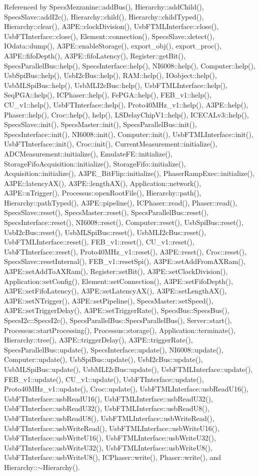 Referenced by SpecsMezzanine::addBus(), Hierarchy::addChild(), SpecsSlave::addI2c(), Hierarchy::child(), Hierarchy::childTyped(), Hierarchy::clear(), A3PE::clockDivision(), UsbFTMLInterface::close(), UsbFTInterface::close(), Element::connection(), SpecsSlave::detect(), IOdata::dump(), A3PE::enableStorage(), export\_\-obj(), export\_\-proc(), A3PE::fifoDepth(), A3PE::fifoLatency(), Register::getBit(), SpecsParallelBus::help(), SpecsInterface::help(), NI6008::help(), Computer::help(), UsbSpiBus::help(), UsbI2cBus::help(), RAM::help(), IOobject::help(), UsbMLSpiBus::help(), UsbMLI2cBus::help(), UsbFTMLInterface::help(), SeqPGA::help(), ICPhaser::help(), FePGA::help(), FEB\_\-v1::help(), CU\_\-v1::help(), UsbFTInterface::help(), Proto40MHz\_\-v1::help(), A3PE::help(), Phaser::help(), Croc::help(), help(), LSDelayChipV1::help(), ICECALv3::help(), SpecsSlave::init(), SpecsMaster::init(), SpecsParallelBus::init(), SpecsInterface::init(), NI6008::init(), Computer::init(), UsbFTMLInterface::init(), UsbFTInterface::init(), Croc::init(), CurrentMeasurement::initialize(), ADCMeasurement::initialize(), EmulateFE::initialize(), StorageFifoAcquisition::initialize(), StorageFifo::initialize(), Acquisition::initialize(), A3PE\_\-BitFlip::initialize(), PhaserRampExec::initialize(), A3PE::latencyAX(), A3PE::lengthAX(), Application::network(), A3PE::nTrigger(), Processus::openRootFile(), Hierarchy::path(), Hierarchy::pathTyped(), A3PE::pipeline(), ICPhaser::read(), Phaser::read(), SpecsSlave::reset(), SpecsMaster::reset(), SpecsParallelBus::reset(), SpecsInterface::reset(), NI6008::reset(), Computer::reset(), UsbSpiBus::reset(), UsbI2cBus::reset(), UsbMLSpiBus::reset(), UsbMLI2cBus::reset(), UsbFTMLInterface::reset(), FEB\_\-v1::reset(), CU\_\-v1::reset(), UsbFTInterface::reset(), Proto40MHz\_\-v1::reset(), A3PE::reset(), Croc::reset(), SpecsSlave::resetInternal(), FEB\_\-v1::resetSpi(), A3PE::setAddFromAXRam(), A3PE::setAddToAXRam(), Register::setBit(), A3PE::setClockDivision(), Application::setConfig(), Element::setConnection(), A3PE::setFifoDepth(), A3PE::setFifoLatency(), A3PE::setLatencyAX(), A3PE::setLengthAX(), A3PE::setNTrigger(), A3PE::setPipeline(), SpecsMaster::setSpeed(), A3PE::setTriggerDelay(), A3PE::setTriggerRate(), SpecsBus::SpecsBus(), SpecsI2c::SpecsI2c(), SpecsParallelBus::SpecsParallelBus(), Server::start(), Processus::startProcessing(), Processus::storage(), Application::terminate(), Hierarchy::tree(), A3PE::triggerDelay(), A3PE::triggerRate(), SpecsParallelBus::update(), SpecsInterface::update(), NI6008::update(), Computer::update(), UsbSpiBus::update(), UsbI2cBus::update(), UsbMLSpiBus::update(), UsbMLI2cBus::update(), UsbFTMLInterface::update(), FEB\_\-v1::update(), CU\_\-v1::update(), UsbFTInterface::update(), Proto40MHz\_\-v1::update(), Croc::update(), UsbFTMLInterface::usbReadU16(), UsbFTInterface::usbReadU16(), UsbFTMLInterface::usbReadU32(), UsbFTInterface::usbReadU32(), UsbFTMLInterface::usbReadU8(), UsbFTInterface::usbReadU8(), UsbFTMLInterface::usbWriteRead(), UsbFTInterface::usbWriteRead(), UsbFTMLInterface::usbWriteU16(), UsbFTInterface::usbWriteU16(), UsbFTMLInterface::usbWriteU32(), UsbFTInterface::usbWriteU32(), UsbFTMLInterface::usbWriteU8(), UsbFTInterface::usbWriteU8(), ICPhaser::write(), Phaser::write(), and Hierarchy::$\sim$Hierarchy().


